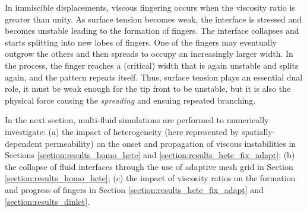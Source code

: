 \documentclass[preprint,authoryear,12pt]{elsarticle}
\begin{document}
\medskip
In immiscible displacements, viscous fingering occurs when the viscosity ratio is greater than unity. As surface tension becomes weak, the interface is stressed and becomes unstable leading to the formation of fingers. The interface collapses and starts splitting into new lobes of fingers. One of the fingers may eventually outgrow the others and then spreads to occupy an increasingly larger width. In the process, the finger reaches a (critical) width that is again unstable and splits again, and the pattern repeats itself. Thus, surface tension plays an essential dual role, it must be weak enough for the tip front to be unstable, but it is also the physical force causing the \textit{spreading} and ensuing repeated branching.

\medskip
In the next section, multi-fluid simulations are performed to numerically investigate: (a) the impact of heterogeneity (here represented by spatially-dependent permeability) on the onset and propagation of viscous instabilities in Sections \ref{section:results_homo_hete} and \ref{section:results_hete_fix_adapt}; (b) the collapse of fluid interfaces through the use of adaptive mesh grid in Section \ref{section:results_homo_hete}; (c) the impact of viscosity ratios on the formation and progress of fingers in Section \ref{section:results_hete_fix_adapt} and \ref{section:results_dinlet}.





\end{document}
